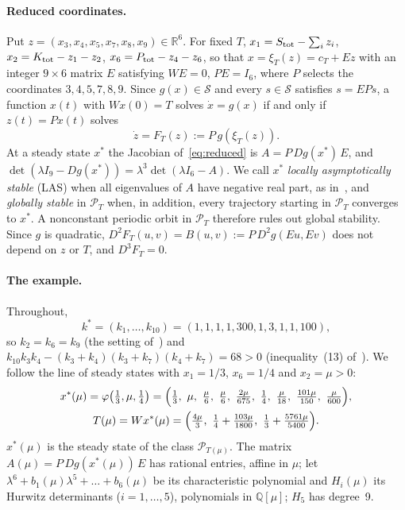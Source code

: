 \documentclass[11pt,a4paper]{report}
\begin{document}
\paragraph{Reduced coordinates.} Put $z=(x_3,x_4,x_5,x_7,x_8,x_9)\in\mathbb R^6$. For fixed $T$, $x_1=S_{\rm tot}-\sum_i z_i$, $x_2=K_{\rm tot}-z_1-z_2$, $x_6=P_{\rm tot}-z_4-z_6$, so that $x=\xi_T(z)=c_T+Ez$ with an integer $9\times6$ matrix $E$ satisfying $WE=0$, $PE=I_6$, where $P$ selects the coordinates $3,4,5,7,8,9$. Since $g(x)\in\mathcal S$ and every $s\in\mathcal S$ satisfies $s=EPs$, a function $x(t)$ with $Wx(0)=T$ solves $\dot x=g(x)$ if and only if $z(t)=Px(t)$ solves
\begin{equation}\label{eq:reduced}
\dot z=F_T(z):=P\,g(\xi_T(z)).
\end{equation}
At a steady state $x^*$ the Jacobian of~\eqref{eq:reduced} is $A=P\,Dg(x^*)\,E$, and $\det(\lambda I_9-Dg(x^*))=\lambda^3\det(\lambda I_6-A)$. We call $x^*$ \emph{locally asymptotically stable} (LAS) when all eigenvalues of $A$ have negative real part, as in~\autocite[§2.2]{CMS2019}, and \emph{globally stable} in $\mathcal P_T$ when, in addition, every trajectory starting in $\mathcal P_T$ converges to $x^*$. A nonconstant periodic orbit in $\mathcal P_T$ therefore rules out global stability. Since $g$ is quadratic, $D^2F_T(u,v)=B(u,v):=P\,D^2g(Eu,Ev)$ does not depend on $z$ or $T$, and $D^3F_T=0$.

\paragraph{The example.} Throughout,
\[
k^*=(k_1,\dots,k_{10})=(1,1,1,1,300,1,3,1,1,100),
\]
so $k_2=k_6=k_9$ (the setting of~\autocite[Prop.~4.1]{CMS2019}) and $k_{10}k_3k_4-(k_3+k_4)(k_3+k_7)(k_4+k_7)=68>0$ (inequality~(13) of~\autocite{CMS2019}). We follow the line of steady states with $x_1=1/3$, $x_6=1/4$ and $x_2=\mu>0$:
\begin{gather}
x^*(\mu)=\varphi\bigl(\tfrac13,\mu,\tfrac14\bigr)=\Bigl(\tfrac13,\ \mu,\ \tfrac{\mu}{6},\ \tfrac{\mu}{6},\ \tfrac{2\mu}{675},\ \tfrac14,\ \tfrac{\mu}{18},\ \tfrac{101\mu}{150},\ \tfrac{\mu}{600}\Bigr),\label{eq:xstar}\\
T(\mu)=Wx^*(\mu)=\Bigl(\tfrac{4\mu}{3},\ \tfrac14+\tfrac{103\mu}{1800},\ \tfrac13+\tfrac{5761\mu}{5400}\Bigr).\label{eq:Tmu}
\end{gather}
$x^*(\mu)$ is the steady state of the class $\mathcal P_{T(\mu)}$. The matrix $A(\mu)=P\,Dg(x^*(\mu))\,E$ has rational entries, affine in $\mu$; let $\lambda^6+b_1(\mu)\lambda^5+\dots+b_6(\mu)$ be its characteristic polynomial and $H_i(\mu)$ its Hurwitz determinants ($i=1,\dots,5$), polynomials in $\mathbb Q[\mu]$; $H_5$ has degree~9.
\end{document}
